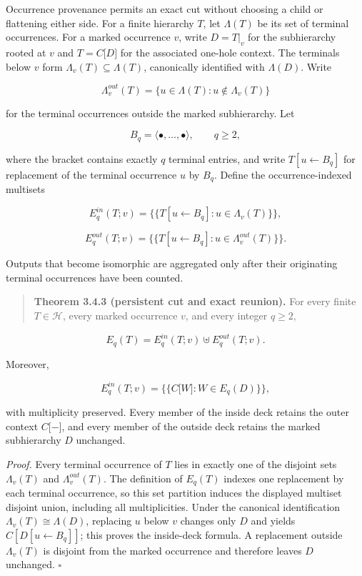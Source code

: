 \documentclass[11pt,a4paper]{article}
\begin{document}
Occurrence provenance permits an exact cut without choosing a child or
flattening either side. For a finite hierarchy \(T\), let \(\Lambda(T)\)
be its set of terminal occurrences. For a marked occurrence \(v\), write
\(D = T|_{v}\) for the subhierarchy rooted at \(v\) and
\(T = C\lbrack D\rbrack\) for the associated one-hole context. The
terminals below \(v\) form \(\Lambda_{v}(T) \subseteq \Lambda(T)\),
canonically identified with \(\Lambda(D)\). Write

\[\Lambda_{v}^{out}(T) = \{ u \in \Lambda(T):u \notin \Lambda_{v}(T)\}\]

for the terminal occurrences outside the marked subhierarchy. Let

\[B_{q} = \langle \bullet ,\ldots, \bullet \rangle,\quad\quad q \geq 2,\]

where the bracket contains exactly \(q\) terminal entries, and write
\(T\left\lbrack u \leftarrow B_{q} \right\rbrack\) for replacement of
the terminal occurrence \(u\) by \(B_{q}\). Define the
occurrence-indexed multisets

\[E_{q}^{in}(T;v) = \{\{ T\left\lbrack u \leftarrow B_{q} \right\rbrack:u \in \Lambda_{v}(T)\}\},\]

\[E_{q}^{out}(T;v) = \{\{ T\left\lbrack u \leftarrow B_{q} \right\rbrack:u \in \Lambda_{v}^{out}(T)\}\}.\]

Outputs that become isomorphic are aggregated only after their
originating terminal occurrences have been counted.

\begin{quote}
\textbf{Theorem 3.4.3 (persistent cut and exact reunion).} For every
finite \(T \in \mathcal{H}\), every marked occurrence \(v\), and every
integer \(q \geq 2\),
\end{quote}

\[\boxed{E_{q}(T) = E_{q}^{in}(T;v) \uplus E_{q}^{out}(T;v).}\]

Moreover,

\[E_{q}^{in}(T;v) = \{\{ C\lbrack W\rbrack:W \in E_{q}(D)\}\},\]

with multiplicity preserved. Every member of the inside deck retains the
outer context \(C\lbrack - \rbrack\), and every member of the outside
deck retains the marked subhierarchy \(D\) unchanged.

\emph{Proof.} Every terminal occurrence of \(T\) lies in exactly one of
the disjoint sets \(\Lambda_{v}(T)\) and \(\Lambda_{v}^{out}(T)\). The
definition of \(E_{q}(T)\) indexes one replacement by each terminal
occurrence, so this set partition induces the displayed multiset
disjoint union, including all multiplicities. Under the canonical
identification \(\Lambda_{v}(T) \cong \Lambda(D)\), replacing \(u\)
below \(v\) changes only \(D\) and yields
\(C\left\lbrack D\left\lbrack u \leftarrow B_{q} \right\rbrack \right\rbrack\);
this proves the inside-deck formula. A replacement outside
\(\Lambda_{v}(T)\) is disjoint from the marked occurrence and therefore
leaves \(D\) unchanged. \(\ensuremath{\square}\)
\end{document}
